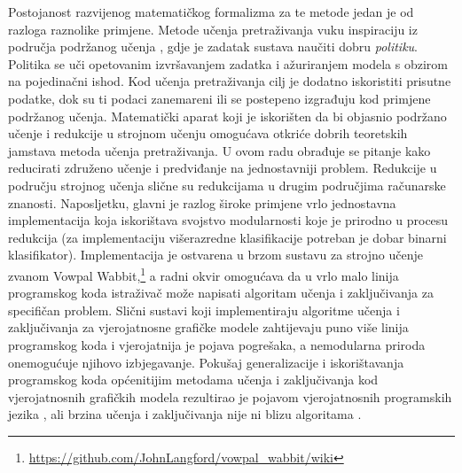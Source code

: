 Postojanost razvijenog matematičkog formalizma za te metode jedan je od razloga
raznolike primjene. Metode učenja pretraživanja vuku inspiraciju iz područja
podržanog učenja  \citep{sutton1998reinforcement},
gdje je zadatak sustava naučiti dobru \emph{politiku}. Politika se uči
opetovanim izvršavanjem zadatka i ažuriranjem modela s obzirom na pojedinačni
ishod. Kod učenja pretraživanja cilj je dodatno iskoristiti prisutne podatke,
dok su ti podaci zanemareni ili se postepeno izgrađuju kod primjene podržanog
učenja. Matematički aparat koji je iskorišten da bi objasnio podržano učenje i
redukcije u strojnom učenju  omogućava otkriće
dobrih teoretskih jamstava metoda učenja pretraživanja. U ovom radu obrađuje se
pitanje kako reducirati združeno učenje i predviđanje  na jednostavniji problem. Redukcije u području strojnog učenja
slične su redukcijama u drugim područjima računarske znanosti. Naposljetku,
glavni je razlog široke primjene vrlo jednostavna implementacija koja
iskorištava svojstvo modularnosti koje je prirodno u procesu redukcija (za
implementaciju višerazredne klasifikacije potreban je dobar binarni
klasifikator). Implementacija je ostvarena u brzom sustavu za strojno učenje
zvanom Vowpal
Wabbit,\footnote{\url{https://github.com/JohnLangford/vowpal_wabbit/wiki}} a
radni okvir \lts{} omogućava da u vrlo malo linija programskog koda
istraživač može napisati algoritam učenja i zaključivanja za specifičan problem.
Slični sustavi koji implementiraju algoritme učenja i zaključivanja za
vjerojatnosne grafičke modele zahtijevaju puno više linija programskog koda i
vjerojatnija je pojava pogrešaka, a nemodularna priroda onemogućuje njihovo
izbjegavanje. Pokušaj generalizacije i iskorištavanja programskog koda
općenitijim metodama učenja i zaključivanja kod vjerojatnosnih grafičkih modela
rezultirao je pojavom vjerojatnosnih programskih jezika , ali brzina učenja i zaključivanja nije ni blizu
algoritama \lts{}.

